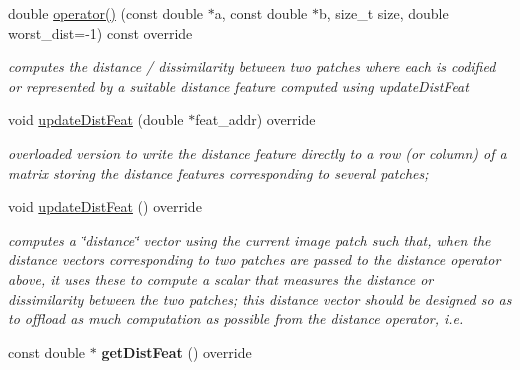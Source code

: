 \begin{DoxyCompactItemize}
\item 
\hypertarget{classRSCV_ab7364483478f93b46c9ebbe54cd84017}{double \hyperlink{classRSCV_ab7364483478f93b46c9ebbe54cd84017}{operator()} (const double $\ast$a, const double $\ast$b, size\-\_\-t size, double worst\-\_\-dist=-\/1) const override}\label{classRSCV_ab7364483478f93b46c9ebbe54cd84017}

\begin{DoxyCompactList}\small\item\em computes the distance / dissimilarity between two patches where each is codified or represented by a suitable distance feature computed using update\-Dist\-Feat \end{DoxyCompactList}\item 
\hypertarget{classRSCV_ad44f0cc259d84a50734ab82e9b974924}{void \hyperlink{classRSCV_ad44f0cc259d84a50734ab82e9b974924}{update\-Dist\-Feat} (double $\ast$feat\-\_\-addr) override}\label{classRSCV_ad44f0cc259d84a50734ab82e9b974924}

\begin{DoxyCompactList}\small\item\em overloaded version to write the distance feature directly to a row (or column) of a matrix storing the distance features corresponding to several patches; \end{DoxyCompactList}\item 
void \hyperlink{classRSCV_ab34ef7660526286c82d50de2c960a96e}{update\-Dist\-Feat} () override
\begin{DoxyCompactList}\small\item\em computes a \char`\"{}distance\char`\"{} vector using the current image patch such that, when the distance vectors corresponding to two patches are passed to the distance operator above, it uses these to compute a scalar that measures the distance or dissimilarity between the two patches; this distance vector should be designed so as to offload as much computation as possible from the distance operator, i.\-e. \end{DoxyCompactList}\item 
\hypertarget{classRSCV_a09ee440305547f8da6928aecc778863d}{const double $\ast$ {\bfseries get\-Dist\-Feat} () override}\label{classRSCV_a09ee440305547f8da6928aecc778863d}

\end{DoxyCompactItemize}
